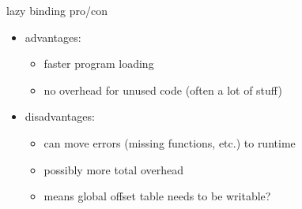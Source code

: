 \begin{frame}{lazy binding pro/con}
\begin{itemize}
    \item advantages:
    \begin{itemize}
        \item faster program loading
        \item no overhead for unused code (often a lot of stuff)
    \end{itemize}
    \item disadvantages:
    \begin{itemize}
        \item can move errors (missing functions, etc.) to runtime
        \item possibly more total overhead
        \item means global offset table needs to be writable?
    \end{itemize}
\end{itemize}
\end{frame}

